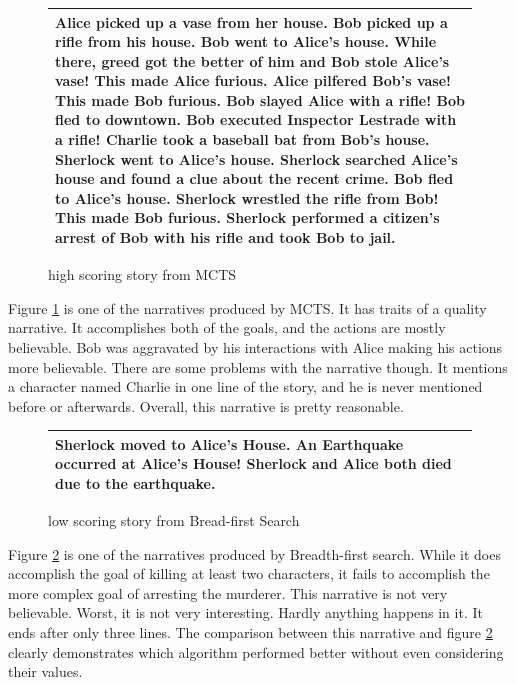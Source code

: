 \documentclass{sig-alternate}
\begin{document}
\begin{figure}[h]
\begin{tabular}{|p{8cm}|}
\hline
Alice picked up a vase from her house. Bob picked up a rifle from his house. Bob went to Alice's house. While there, greed got the better of him and Bob stole Alice's vase! This made Alice furious. Alice pilfered Bob's vase! This made Bob furious. Bob slayed Alice with a rifle! Bob fled to downtown. Bob executed Inspector Lestrade with a rifle! Charlie took a baseball bat from Bob's house. Sherlock went to Alice's house. Sherlock searched Alice's house and found a clue about the recent crime. Bob fled to Alice's house. Sherlock wrestled the rifle from Bob! This made Bob furious. Sherlock performed a citizen's arrest of Bob with his rifle and took Bob to jail. \\ \hline
\end{tabular}
\centering
\caption{high scoring story from MCTS}
\label{fig:GoodStory}
\end{figure}

Figure \ref{fig:GoodStory} is one of the narratives produced by MCTS. It has traits of a quality narrative. It accomplishes both of the goals, and the actions are mostly believable. Bob was aggravated by his interactions with Alice making his actions more believable. There are some problems with the narrative though. It mentions a character named Charlie in one line of the story, and he is never mentioned before or afterwards. Overall, this narrative is pretty reasonable.

\begin{figure}[h]
\begin{tabular}{|p{8cm}|}
\hline
Sherlock moved to Alice's House. An Earthquake occurred at Alice's House! Sherlock and Alice both died due to the earthquake. \\ \hline
\end{tabular}
\centering
\caption{low scoring story from Bread-first Search}
\label{fig:BadStory}
\end{figure}

Figure \ref{fig:BadStory} is one of the narratives produced by Breadth-first search. While it does accomplish the goal of killing at least two characters, it fails to accomplish the more complex goal of arresting the murderer. This narrative is not very believable. Worst, it is not very interesting. Hardly anything happens in it. It ends after only three lines. The comparison between this narrative and figure \ref{fig:BadStory} clearly demonstrates which algorithm performed better without even considering their values. 
\end{document}
